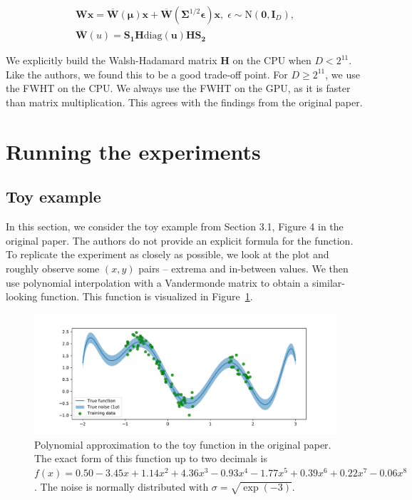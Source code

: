 \documentclass[11pt, twocolumn]{article}
\begin{document}
    \begin{align}
        \mathbf{W}\mathbf{x} = \overline{\mathbf{W}}(\mathbf{\mu})\mathbf{x} + \overline{\mathbf{W}}(\mathbf{\Sigma}^{1/2}\mathbf{\epsilon})\mathbf{x}, \; \epsilon \sim \mathrm{N}(\mathbf{0}, \mathbf{I}_D)\label{eqn:lrt1},\\
        \overline{\mathbf{W}}(u) = \mathbf{S_1} \mathbf{H} \mathrm{diag}(\mathbf{u}) \mathbf{H} \mathbf{S_2}\label{eqn:lrt2}
    \end{align}

    We explicitly build the Walsh-Hadamard matrix $\mathbf{H}$ on the CPU when $D < 2^{11}$.
    Like the authors, we found this to be a good trade-off point.
    For $D \ge 2^{11}$, we use the FWHT on the CPU.
    We always use the FWHT on the GPU, as it is faster than matrix multiplication.
    This agrees with the findings from the original paper.

    \section{Running the experiments}\label{sec:running-the-experiments}

    \subsection{Toy example}\label{sec:toy-example}
    In this section, we consider the toy example from Section 3.1, Figure 4 in the original paper.
    The authors do not provide an explicit formula for the function.
    To replicate the experiment as closely as possible, we look at the plot and roughly observe some $(x, y)$ pairs -- extrema and in-between values.
    We then use polynomial interpolation with a Vandermonde matrix to obtain a similar-looking function.
    This function is visualized in Figure~\ref{fig:toy-function}.

    \begin{figure}
        \centering
        \includegraphics[width=1.0\hsize]{img/toy-function.pdf}
        \caption{Polynomial approximation to the toy function in the original paper.
        The exact form of this function up to two decimals is $f(x) = 0.50 -3.45x + 1.14x^2 + 4.36x^3 -0.93x^4 -1.77x^5 + 0.39x^6 + 0.22x^7 -0.06x^8$. The noise is normally distributed with $\sigma = \sqrt{\exp (-3)}$.
        }
        \label{fig:toy-function}
    \end{figure}
\end{document}
